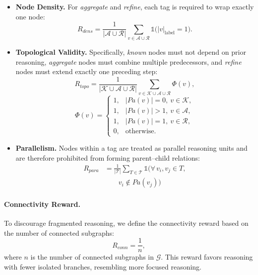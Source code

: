\begin{itemize}

\item \textbf{Node Density.}
For \textit{aggregate} and \textit{refine}, each tag is required to wrap exactly one node:
\begin{equation}
R_{dens}
=
\frac{1}{|\mathcal{A} \cup \mathcal{R}|}
\sum_{v \in \mathcal{A} \cup \mathcal{R}}
\mathds{1}
\big(
|v|_{\text{label}} = 1
\big).
\end{equation}

\item \textbf{Topological Validity.} Specifically, \textit{known} nodes must not depend on prior reasoning, \textit{aggregate} nodes must combine multiple predecessors, and \textit{refine} nodes must extend exactly one preceding step:
\begin{equation}
R_{topo}
=
\frac{1}{|\mathcal{K} \cup \mathcal{A} \cup \mathcal{R}|}
\sum_{v \in \mathcal{K} \cup \mathcal{A} \cup \mathcal{R}}
\Phi(v),
\end{equation}
\begin{equation}
\Phi(v)
=
\begin{cases}
1, & |Pa(v)| = 0,\ v \in \mathcal{K}, \\
1, & |Pa(v)| > 1,\ v \in \mathcal{A}, \\
1, & |Pa(v)| = 1,\ v \in \mathcal{R}, \\
0, & \text{otherwise}.
\end{cases}
\end{equation}


\item \textbf{Parallelism.}
Nodes within a tag are treated as parallel reasoning units and are therefore prohibited from forming parent--child relations:
\begin{equation}
\begin{aligned}
R_{para}
&=
\frac{1}{|\mathcal{T}|}
\sum_{T \in \mathcal{T}}
\mathds{1}
\Big(
\forall\, v_i, v_j \in T, \\
&\qquad
v_i \notin Pa(v_j)
\Big)
\end{aligned}
\end{equation}
\end{itemize}

\paragraph{Connectivity Reward.} To discourage fragmented reasoning, we define the connectivity reward based on the number of connected subgraphs:
\begin{equation}
R_{conn}
=
\frac{1}{n},
\end{equation}
where $n$ is the number of connected subgraphs in $\mathcal{G}$. This reward favors reasoning with fewer isolated branches, resembling more focused reasoning.

